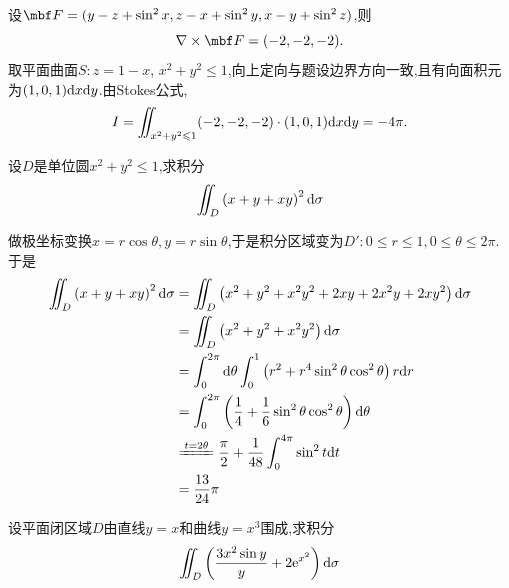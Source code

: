 \documentclass{ctexart}
\begin{document}
\begin{solution}
设$\mbf F=(y-z+\sin^2x,z-x+\sin^2y,x-y+\sin^2z)$,则
    \[\nabla\times\mbf F=(-2,-2,-2).\]
    取平面曲面$S:z=1-x$, $x^2+y^2\leqslant1$,向上定向与题设边界方向一致,且有向面积元为$(1,0,1)\mathrm{d} x\mathrm{d} y$.由Stokes公式,
    \[I=\iint_{x^2+y^2\leqslant1}(-2,-2,-2)\cdot(1,0,1)\mathrm{d} x\mathrm{d} y=-4\pi.\]
\end{solution}
\begin{problem}[6.(10\songti{分})]
    设$D$是单位圆$x^2+y^2\leqslant1$,求积分
    \[\iint_D\left(x+y+xy\right)^2\mathrm{d}\sigma\]

\end{problem}
\begin{solution}
    做极坐标变换$x=r\cos\theta,y=r\sin\theta$,于是积分区域变为$D':0\leqslant r\leqslant 1,0\leqslant\theta\leqslant2\pi$.于是
    \[\begin{aligned}
        \iint_{D}\left(x+y+xy\right)^2\di\sigma
        &= \iint_{D}\left(x^2+y^2+x^2y^2+2xy+2x^2y+2xy^2\right)\di\sigma \\
        &= \iint_{D}\left(x^2+y^2+x^2y^2\right)\di\sigma \\
        &= \int_0^{2\pi}\di\theta\int_0^1\left(r^2+r^4\sin^2\theta\cos^2\theta\right)r\di r \\
        &= \int_0^{2\pi}\left(\dfrac14+\dfrac16\sin^2\theta\cos^2\theta\right)\di\theta \\
        &\xlongequal{t=2\theta} \dfrac\pi2+\dfrac{1}{48}\int_0^{4\pi}\sin^2 t\di t \\
        &= \dfrac{13}{24}\pi
    \end{aligned}\]
\end{solution}
\begin{problem}[7.(10\songti{分})]
    设平面闭区域$D$由直线$y=x$和曲线$y=x^3$围成,求积分
    \[\iint_D\left(\dfrac{3x^2\sin y}{y}+2\mathrm{e}^{x^2}\right)\mathrm{d}\sigma\]

\end{problem}
\end{document}

